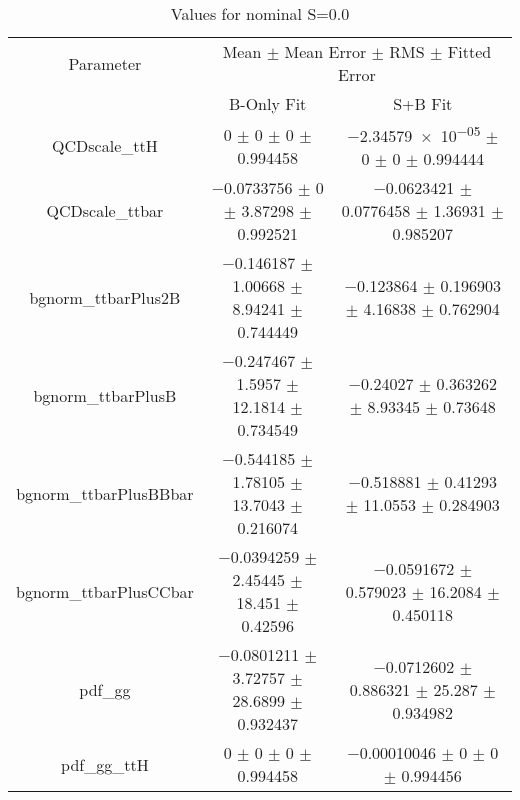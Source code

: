 \begin{table}
\centering
\caption{Values for nominal S=0.0}
\begin{tabular}{ccc}
\toprule
Parameter & \multicolumn{2}{c}{Mean $\pm$ Mean Error $\pm$ RMS $\pm$ Fitted Error}\\
 & B-Only Fit & S+B Fit\\
\midrule
QCDscale\_ttH & \num{0} $\pm$ \num{0} $\pm$ \num{0} $\pm$ \num{0.994458} & \num{-2.34579e-05} $\pm$ \num{0} $\pm$ \num{0} $\pm$ \num{0.994444}\\
QCDscale\_ttbar & \num{-0.0733756} $\pm$ \num{0} $\pm$ \num{3.87298} $\pm$ \num{0.992521} & \num{-0.0623421} $\pm$ \num{0.0776458} $\pm$ \num{1.36931} $\pm$ \num{0.985207}\\
bgnorm\_ttbarPlus2B & \num{-0.146187} $\pm$ \num{1.00668} $\pm$ \num{8.94241} $\pm$ \num{0.744449} & \num{-0.123864} $\pm$ \num{0.196903} $\pm$ \num{4.16838} $\pm$ \num{0.762904}\\
bgnorm\_ttbarPlusB & \num{-0.247467} $\pm$ \num{1.5957} $\pm$ \num{12.1814} $\pm$ \num{0.734549} & \num{-0.24027} $\pm$ \num{0.363262} $\pm$ \num{8.93345} $\pm$ \num{0.73648}\\
bgnorm\_ttbarPlusBBbar & \num{-0.544185} $\pm$ \num{1.78105} $\pm$ \num{13.7043} $\pm$ \num{0.216074} & \num{-0.518881} $\pm$ \num{0.41293} $\pm$ \num{11.0553} $\pm$ \num{0.284903}\\
bgnorm\_ttbarPlusCCbar & \num{-0.0394259} $\pm$ \num{2.45445} $\pm$ \num{18.451} $\pm$ \num{0.42596} & \num{-0.0591672} $\pm$ \num{0.579023} $\pm$ \num{16.2084} $\pm$ \num{0.450118}\\
pdf\_gg & \num{-0.0801211} $\pm$ \num{3.72757} $\pm$ \num{28.6899} $\pm$ \num{0.932437} & \num{-0.0712602} $\pm$ \num{0.886321} $\pm$ \num{25.287} $\pm$ \num{0.934982}\\
pdf\_gg\_ttH & \num{0} $\pm$ \num{0} $\pm$ \num{0} $\pm$ \num{0.994458} & \num{-0.00010046} $\pm$ \num{0} $\pm$ \num{0} $\pm$ \num{0.994456}\\
\bottomrule
\end{tabular}
\end{table}